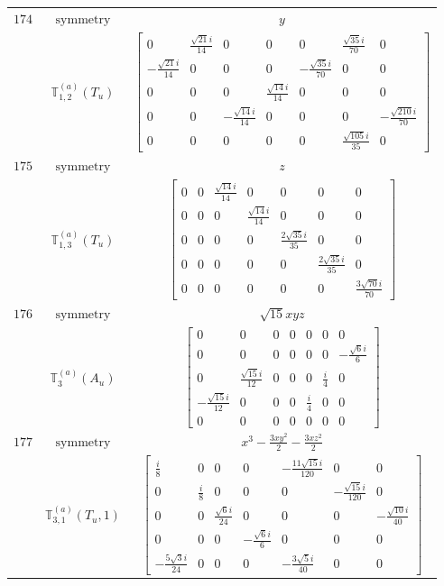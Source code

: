 \documentclass[fleqn,8pt,landscape]{jsarticle}
\begin{document}
\begin{longtable}{ccc}
$ 174 $ & $ \text{symmetry} $ & $ y $ \\
$  $ & $ \mathbb{T}_{1,2}^{(a)}(T_{u}) $ & $ \begin{bmatrix} 0 & \frac{\sqrt{21} i}{14} & 0 & 0 & 0 & \frac{\sqrt{35} i}{70} & 0 \\ - \frac{\sqrt{21} i}{14} & 0 & 0 & 0 & - \frac{\sqrt{35} i}{70} & 0 & 0 \\ 0 & 0 & 0 & \frac{\sqrt{14} i}{14} & 0 & 0 & 0 \\ 0 & 0 & - \frac{\sqrt{14} i}{14} & 0 & 0 & 0 & - \frac{\sqrt{210} i}{70} \\ 0 & 0 & 0 & 0 & 0 & \frac{\sqrt{105} i}{35} & 0 \end{bmatrix} $ \\ \hline
$ 175 $ & $ \text{symmetry} $ & $ z $ \\
$  $ & $ \mathbb{T}_{1,3}^{(a)}(T_{u}) $ & $ \begin{bmatrix} 0 & 0 & \frac{\sqrt{14} i}{14} & 0 & 0 & 0 & 0 \\ 0 & 0 & 0 & \frac{\sqrt{14} i}{14} & 0 & 0 & 0 \\ 0 & 0 & 0 & 0 & \frac{2 \sqrt{35} i}{35} & 0 & 0 \\ 0 & 0 & 0 & 0 & 0 & \frac{2 \sqrt{35} i}{35} & 0 \\ 0 & 0 & 0 & 0 & 0 & 0 & \frac{3 \sqrt{70} i}{70} \end{bmatrix} $ \\ \hline
$ 176 $ & $ \text{symmetry} $ & $ \sqrt{15} x y z $ \\
$  $ & $ \mathbb{T}_{3}^{(a)}(A_{u}) $ & $ \begin{bmatrix} 0 & 0 & 0 & 0 & 0 & 0 & 0 \\ 0 & 0 & 0 & 0 & 0 & 0 & - \frac{\sqrt{6} i}{6} \\ 0 & \frac{\sqrt{15} i}{12} & 0 & 0 & 0 & \frac{i}{4} & 0 \\ - \frac{\sqrt{15} i}{12} & 0 & 0 & 0 & \frac{i}{4} & 0 & 0 \\ 0 & 0 & 0 & 0 & 0 & 0 & 0 \end{bmatrix} $ \\ \hline
$ 177 $ & $ \text{symmetry} $ & $ x^{3} - \frac{3 x y^{2}}{2} - \frac{3 x z^{2}}{2} $ \\
$  $ & $ \mathbb{T}_{3,1}^{(a)}(T_{u},1) $ & $ \begin{bmatrix} \frac{i}{8} & 0 & 0 & 0 & - \frac{11 \sqrt{15} i}{120} & 0 & 0 \\ 0 & \frac{i}{8} & 0 & 0 & 0 & - \frac{\sqrt{15} i}{120} & 0 \\ 0 & 0 & \frac{\sqrt{6} i}{24} & 0 & 0 & 0 & - \frac{\sqrt{10} i}{40} \\ 0 & 0 & 0 & - \frac{\sqrt{6} i}{6} & 0 & 0 & 0 \\ - \frac{5 \sqrt{3} i}{24} & 0 & 0 & 0 & - \frac{3 \sqrt{5} i}{40} & 0 & 0 \end{bmatrix} $ \\ \hline

\end{longtable}
\end{document}
